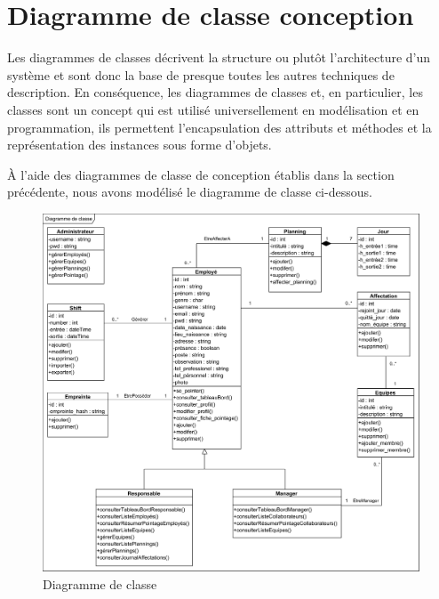 \section{Diagramme de classe conception}
Les diagrammes de classes décrivent la structure ou plutôt l’architecture d’un système et sont donc la base de presque toutes les autres techniques de description. En conséquence, les diagrammes de classes et, en particulier, les classes sont un concept qui est utilisé universellement en modélisation et en programmation, ils permettent l’encapsulation des attributs et méthodes et la représentation des instances sous forme d’objets\cite{10}.

À l’aide des diagrammes de classe de conception établis dans la section précédente, nous avons modélisé le diagramme de classe ci-dessous.

        \begin{figure}[h!]
                 \centering
                \includegraphics[scale=0.69]{images/DCC/Diagramme de classe.png}
                 \caption{Diagramme de classe}
                 \label{fig47}
        \end{figure}

